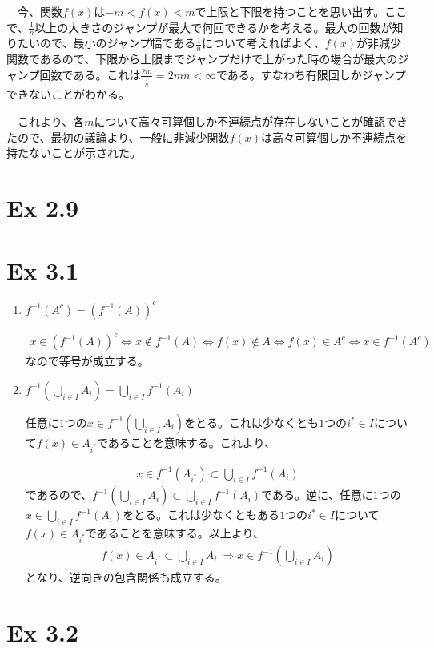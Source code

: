 \documentclass{article}
\begin{document}
　今、関数$f(x)$は$-m < f(x) < m$で上限と下限を持つことを思い出す。ここで、$\frac{1}{n}$以上の大きさのジャンプが最大で何回できるかを考える。最大の回数が知りたいので、最小のジャンプ幅である$\frac{1}{n}$について考えればよく、$f(x)$が非減少関数であるので、下限から上限までジャンプだけで上がった時の場合が最大のジャンプ回数である。これは$\frac{2m}{\frac{1}{n}} = 2mn < \infty$である。すなわち有限回しかジャンプできないことがわかる。

　これより、各$m$について高々可算個しか不連続点が存在しないことが確認できたので、最初の議論より、一般に非減少関数$f(x)$は高々可算個しか不連続点を持たないことが示された。

\section{Ex 2.9}

\section{Ex 3.1}
\begin{enumerate}
	\item $f^{-1}\left( A^c \right) = \left( f^{-1}\left( A \right) \right)^c$
	
	\begin{align*}
		x \in \left( f^{-1}\left( A \right) \right)^c \Leftrightarrow x \not\in f^{-1}\left( A \right) \Leftrightarrow f(x) \not\in A \Leftrightarrow f(x) \in A^c \Leftrightarrow x \in f^{-1}\left( A^c \right)
	\end{align*}
	なので等号が成立する。
	\item $f^{-1}\left( \bigcup_{i\in I} A_i \right) = \bigcup_{i\in I} f^{-1} \left( A_i \right)$
	
	任意に$1$つの$x \in f^{-1}\left( \bigcup_{i\in I} A_i \right)$をとる。これは少なくとも$1$つの$i^* \in I$について$f(x) \in A_{i^*}$であることを意味する。これより、
	
	\begin{align*}
		x \in f^{-1}\left( A_{i^*}\right) \subset \bigcup_{i \in I} f^{-1}\left( A_i \right)
	\end{align*}
	であるので、$f^{-1}\left( \bigcup_{i\in I} A_i \right) \subset \bigcup_{i\in I} f^{-1} \left( A_i \right)$である。逆に、任意に$1$つの$x \in \bigcup_{i\in I} f^{-1} \left( A_i \right)$をとる。これは少なくともある$1$つの$i^* \in I$について$f(x) \in A_{i^*}$であることを意味する。以上より、
	\begin{align*}
		f(x) \in A_{i^*} \subset \bigcup_{i\in I} A_i\ \Rightarrow x \in f^{-1}\left( \bigcup_{i \in I} A_i \right)
	\end{align*}
	となり、逆向きの包含関係も成立する。
\end{enumerate}

\section{Ex 3.2}
\end{document}
